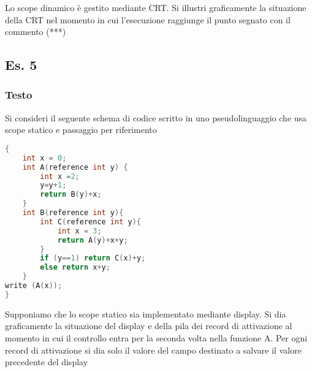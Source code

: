 Lo scope dinamico è gestito mediante CRT. Si illustri graficamente la situazione della CRT nel momento in cui l'esecuzione raggiunge il punto segnato con il commento (***)
\subsection{Es. 5}
\subsubsection{Testo}

Si consideri il seguente schema di codice scritto in uno pseudolinguaggio che usa scope statico e passaggio per riferimento

\begin{lstlisting}[language=C]
{
    int x = 0;
    int A(reference int y) {
        int x =2;
        y=y+1;
        return B(y)+x;
    }
    int B(reference int y){
        int C(reference int y){
            int x = 3;
            return A(y)+x+y;
        }
        if (y==1) return C(x)+y;
        else return x+y;
    }
write (A(x));
}
\end{lstlisting}

Supponiamo che lo scope statico sia implementato mediante display. Si dia graficamente la situazione del display e della pila dei record di attivazione al momento in cui il controllo entra per la seconda volta nella funzione A. Per ogni record di attivazione si dia solo il valore del campo destinato a salvare il valore precedente del display